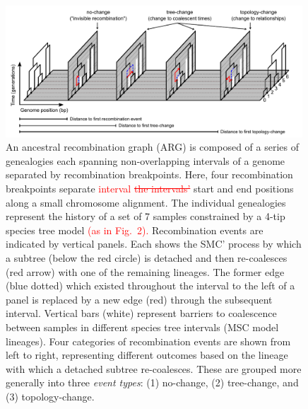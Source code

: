 \documentclass[11pt]{article}
\begin{document}
\begin{figure}[t]
	\centering
	\includegraphics[width=0.99\textwidth]{figures/current/Fig1-recomb-types-on-ARG.pdf}
	\caption{
		An ancestral recombination graph (ARG)
		is composed of a series of genealogies each spanning non-overlapping 
		intervals of a genome separated by recombination breakpoints. Here, 
		four recombination breakpoints separate \textcolor{red}{interval}
		\textcolor{red}{\sout{the intervals'}}
		start and end positions
		along a small chromosome alignment. The individual genealogies represent the history of a set of 7 samples constrained
		by a 4-tip species tree model
		\textcolor{red}{(as in Fig.~2).}
		Recombination events are indicated by vertical panels. Each shows the SMC' process by 
		which a subtree (below the red circle) is detached and then re-coalesces (red arrow)
		with one of the remaining lineages. %
		The former edge (blue dotted) which existed throughout the interval to the left of a 
		panel is replaced by a new edge (red) through the subsequent interval. 
		Vertical bars 
		(white) represent barriers to coalescence between samples in different species
		tree intervals (MSC model lineages).
		Four categories of recombination events are shown from left to right, representing
		different outcomes based on the lineage with which a detached subtree re-coalesces.
		These are grouped more generally into 
		three \emph{event types}: (1) no-change, (2) tree-change, and (3) topology-change.
}
\end{figure}
\end{document}

